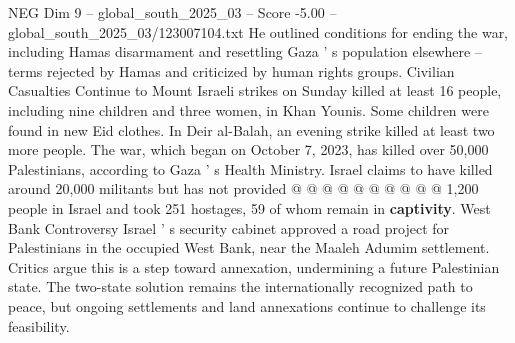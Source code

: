 \begin{textsample}{NEG Dim 9 – global\_south\_2025\_03 – Score -5.00 – global\_south\_2025\_03/123007104.txt}
He outlined conditions for ending the war, including Hamas disarmament and resettling Gaza ' s population elsewhere -- terms rejected by Hamas and criticized by human rights groups.
Civilian Casualties Continue to Mount Israeli strikes on Sunday killed at least 16 people, including nine children and three women, in Khan Younis.
Some children were found in new Eid clothes.
In Deir al-Balah, an evening strike killed at least two more people.
The war, which began on October 7, 2023, has killed over 50,000 Palestinians, according to Gaza ' s Health Ministry.
Israel claims to have killed around 20,000 militants but has not provided @ @ @ @ @ @ @ @ @ @ 1,200 people in Israel and took 251 hostages, 59 of whom remain in \textbf{captivity}.
West Bank Controversy Israel ' s security cabinet approved a road project for Palestinians in the occupied West Bank, near the Maaleh Adumim settlement.
Critics argue this is a step toward annexation, undermining a future Palestinian state.
The two-state solution remains the internationally recognized path to peace, but ongoing settlements and land annexations continue to challenge its feasibility.

\end{textsample}
